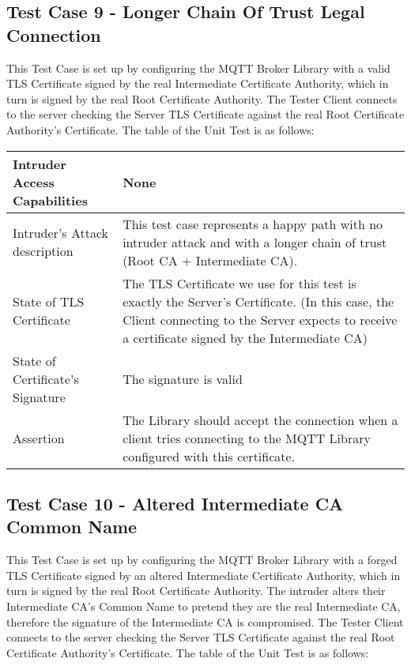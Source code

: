 \documentclass[binding=0.6cm,noexaminfo]{sapthesis}
\begin{document}
\subsection{Test Case 9 - Longer Chain Of Trust Legal Connection}
This Test Case is set up by configuring the MQTT Broker Library with a valid TLS Certificate signed by the real Intermediate Certificate Authority, which in turn is signed by the real Root Certificate Authority. The Tester Client connects to the server checking the Server TLS Certificate against the real Root Certificate Authority’s Certificate. The table of the Unit Test is as follows:

\begin{center}
\begin{tabular}{| p{6cm} | p{6cm} |}
\hline
Intruder Access Capabilities & None \\
\hline
Intruder’s Attack description & This test case represents a happy path with no intruder attack and with a longer chain of trust (Root CA + Intermediate CA). \\
\hline
State of TLS Certificate & The TLS Certificate we use for this test is exactly the Server’s Certificate. (In this case, the Client connecting to the Server expects to receive a certificate signed by the Intermediate CA) \\
\hline
State of Certificate’s Signature & The signature is valid \\
\hline
Assertion & The Library should accept the connection when a client tries connecting to the MQTT Library configured with this certificate. \\
\hline
\end{tabular}
\end{center}

\subsection{Test Case 10 - Altered Intermediate CA Common Name}
This Test Case is set up by configuring the MQTT Broker Library with a forged TLS Certificate signed by an altered Intermediate Certificate Authority, which in turn is signed by the real Root Certificate Authority. The intruder alters their Intermediate CA’s Common Name to pretend they are the real Intermediate CA, therefore the signature of the Intermediate CA is compromised. The Tester Client connects to the server checking the Server TLS Certificate against the real Root Certificate Authority’s Certificate. The table of the Unit Test is as follows:
\end{document}
